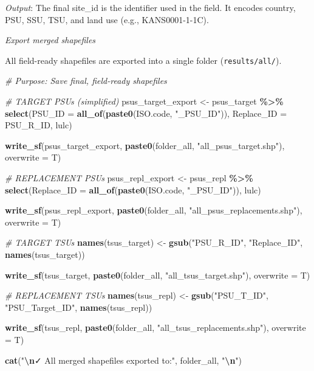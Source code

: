 \documentclass[
  10pt,
  b5paper,
  oneside]{book}
\newenvironment{Shaded}{\begin{snugshade}}{\end{snugshade}}
\newcommand{\AttributeTok}[1]{\textcolor[rgb]{0.13,0.29,0.53}{#1}}
\newcommand{\CommentTok}[1]{\textcolor[rgb]{0.56,0.35,0.01}{\textit{#1}}}
\newcommand{\FunctionTok}[1]{\textcolor[rgb]{0.13,0.29,0.53}{\textbf{#1}}}
\newcommand{\NormalTok}[1]{#1}
\newcommand{\OtherTok}[1]{\textcolor[rgb]{0.56,0.35,0.01}{#1}}
\newcommand{\SpecialCharTok}[1]{\textcolor[rgb]{0.81,0.36,0.00}{\textbf{#1}}}
\newcommand{\StringTok}[1]{\textcolor[rgb]{0.31,0.60,0.02}{#1}}
\begin{document}
\emph{Output}: The final site\_id is the identifier used in the field. It encodes country, PSU, SSU, TSU, and land use (e.g., KANS0001-1-1C).

\emph{Export merged shapefiles}

All field-ready shapefiles are exported into a single folder (\texttt{results/all/}).

\begin{Shaded}
\begin{Highlighting}[]
\CommentTok{\# Purpose: Save final, field{-}ready shapefiles}

\CommentTok{\# TARGET PSUs (simplified)}
\NormalTok{psus\_target\_export }\OtherTok{\textless{}{-}}\NormalTok{ psus\_target }\SpecialCharTok{\%\textgreater{}\%}
  \FunctionTok{select}\NormalTok{(}\AttributeTok{PSU\_ID =} \FunctionTok{all\_of}\NormalTok{(}\FunctionTok{paste0}\NormalTok{(ISO.code, }\StringTok{"\_PSU\_ID"}\NormalTok{)), }
         \AttributeTok{Replace\_ID =}\NormalTok{ PSU\_R\_ID, lulc)}

\FunctionTok{write\_sf}\NormalTok{(psus\_target\_export, }\FunctionTok{paste0}\NormalTok{(folder\_all, }\StringTok{"all\_psus\_target.shp"}\NormalTok{), }\AttributeTok{overwrite =}\NormalTok{ T)}

\CommentTok{\# REPLACEMENT PSUs}
\NormalTok{psus\_repl\_export }\OtherTok{\textless{}{-}}\NormalTok{ psus\_repl }\SpecialCharTok{\%\textgreater{}\%}
  \FunctionTok{select}\NormalTok{(}\AttributeTok{Replace\_ID =} \FunctionTok{all\_of}\NormalTok{(}\FunctionTok{paste0}\NormalTok{(ISO.code, }\StringTok{"\_PSU\_ID"}\NormalTok{)), lulc)}

\FunctionTok{write\_sf}\NormalTok{(psus\_repl\_export, }\FunctionTok{paste0}\NormalTok{(folder\_all, }\StringTok{"all\_psus\_replacements.shp"}\NormalTok{), }\AttributeTok{overwrite =}\NormalTok{ T)}

\CommentTok{\# TARGET TSUs}
\FunctionTok{names}\NormalTok{(tsus\_target) }\OtherTok{\textless{}{-}} \FunctionTok{gsub}\NormalTok{(}\StringTok{"PSU\_R\_ID"}\NormalTok{, }\StringTok{"Replace\_ID"}\NormalTok{, }\FunctionTok{names}\NormalTok{(tsus\_target))}

\FunctionTok{write\_sf}\NormalTok{(tsus\_target, }\FunctionTok{paste0}\NormalTok{(folder\_all, }\StringTok{"all\_tsus\_target.shp"}\NormalTok{), }\AttributeTok{overwrite =}\NormalTok{ T)}

\CommentTok{\# REPLACEMENT TSUs}
\FunctionTok{names}\NormalTok{(tsus\_repl) }\OtherTok{\textless{}{-}} \FunctionTok{gsub}\NormalTok{(}\StringTok{"PSU\_T\_ID"}\NormalTok{, }\StringTok{"PSU\_Target\_ID"}\NormalTok{, }\FunctionTok{names}\NormalTok{(tsus\_repl))}

\FunctionTok{write\_sf}\NormalTok{(tsus\_repl, }\FunctionTok{paste0}\NormalTok{(folder\_all, }\StringTok{"all\_tsus\_replacements.shp"}\NormalTok{), }\AttributeTok{overwrite =}\NormalTok{ T)}

\FunctionTok{cat}\NormalTok{(}\StringTok{"}\SpecialCharTok{\textbackslash{}n}\StringTok{✓ All merged shapefiles exported to:"}\NormalTok{, folder\_all, }\StringTok{"}\SpecialCharTok{\textbackslash{}n}\StringTok{"}\NormalTok{)}
\end{Highlighting}
\end{Shaded}
\end{document}

